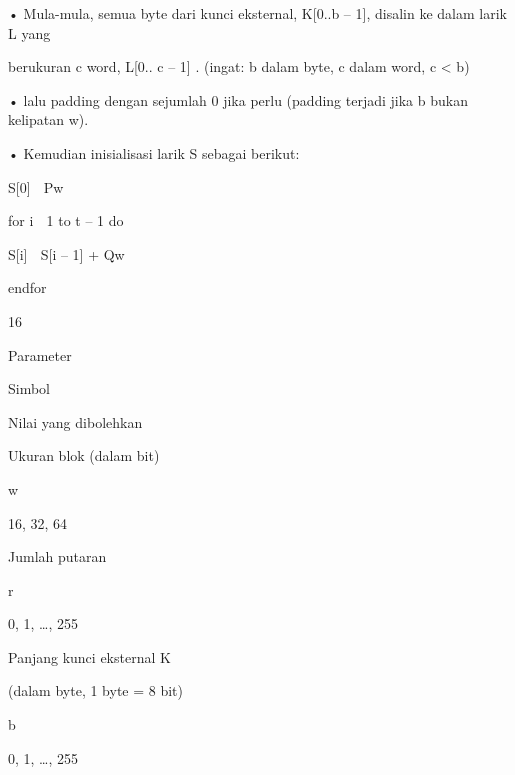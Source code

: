 \documentclass{article}
\begin{document}

• Mula-mula, semua byte dari kunci eksternal, K[0..b – 1], disalin ke dalam larik L yang 

berukuran c word, L[0.. c – 1] .  (ingat: b dalam byte, c dalam word, c < b)

• lalu padding dengan sejumlah 0 jika perlu (padding terjadi jika b bukan kelipatan w). 

• Kemudian inisialisasi larik S sebagai berikut:

 S[0]  Pw

 for i  1 to t – 1  do

     S[i]  S[i – 1] + Qw

 endfor

16


Parameter 

Simbol 

Nilai yang dibolehkan 

Ukuran blok (dalam bit) 

w 

16, 32, 64 

Jumlah putaran 

r 

0, 1, …, 255 

Panjang kunci eksternal K 

(dalam byte, 1 byte = 8 bit) 

b 

0, 1, …, 255
\end{document}
